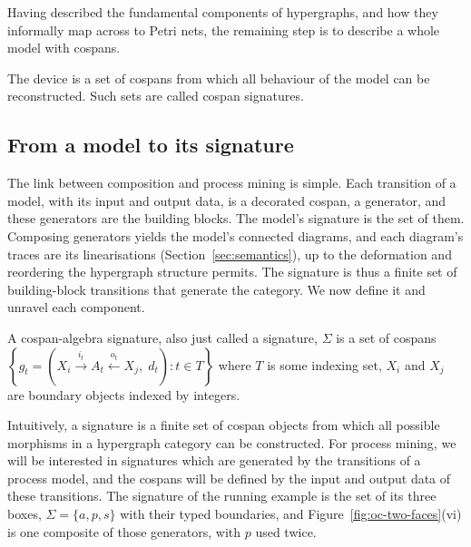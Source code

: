 Having described the fundamental components of hypergraphs, and how they informally map across to Petri nets, the remaining step is to describe a whole model with cospans.

The device is a set of cospans from which all behaviour of the model can be reconstructed. Such sets are called cospan signatures.

\subsection{From a model to its signature}

The link between composition and process mining is simple. Each transition of a
model, with its input and output data, is a decorated cospan, a generator, and these
generators are the building blocks. The model's signature is the set of them. Composing
generators yields the model's connected diagrams, and each diagram's traces are its
linearisations (Section~\ref{sec:semantics}), up to the deformation and reordering the
hypergraph structure permits. The signature is thus a finite set of building-block
transitions that generate the category. We now define it and unravel each component.
\begin{definition}
A cospan-algebra signature, also just called a signature, $\Sigma$ is a set of cospans $\left\{g_t = \left(X_i\xrightarrow{i_t} A_t \xleftarrow{o_t} X_j,\; d_t\right) : t \in T\right\}$ where $T$ is some indexing set, $X_i$ and $X_j$ are boundary objects indexed by integers.
\end{definition}
Intuitively, a signature is a finite set of cospan objects from which all possible morphisms in a hypergraph category can be constructed. For process mining, we will be interested in signatures which are generated by the transitions of a process model, and the cospans will be defined by the input and output data of these transitions.
The signature of the running example is the set of its three boxes,
$\Sigma=\{a,p,s\}$ with their typed boundaries, and
Figure~\ref{fig:oc-two-faces}(vi) is one composite of those generators, with
$p$ used twice.

